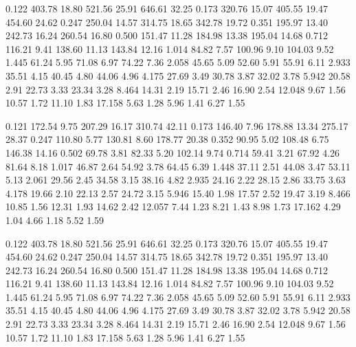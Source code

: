 
 0.122  403.78   18.80  521.56   25.91  646.61   32.25
 0.173  320.76   15.07  405.55   19.47  454.60   24.62
 0.247  250.04   14.57  314.75   18.65  342.78   19.72
 0.351  195.97   13.40  242.73   16.24  260.54   16.80
 0.500  151.47   11.28  184.98   13.38  195.04   14.68
 0.712  116.21    9.41  138.60   11.13  143.84   12.16
 1.014   84.82    7.57  100.96    9.10  104.03    9.52
 1.445   61.24    5.95   71.08    6.97   74.22    7.36
 2.058   45.65    5.09   52.60    5.91   55.91    6.11
 2.933   35.51    4.15   40.45    4.80   44.06    4.96
 4.175   27.69    3.49   30.78    3.87   32.02    3.78
 5.942   20.58    2.91   22.73    3.33   23.34    3.28
 8.464   14.31    2.19   15.71    2.46   16.90    2.54
12.048    9.67    1.56   10.57    1.72   11.10    1.83
17.158    5.63    1.28    5.96    1.41    6.27    1.55

 
 0.121  172.54    9.75  207.29   16.17  310.74   42.11
 0.173  146.40    7.96  178.88   13.34  275.17   28.37
 0.247  110.80    5.77  130.81    8.60  178.77   20.38
 0.352   90.95    5.02  108.48    6.75  146.38   14.16
 0.502   69.78    3.81   82.33    5.20  102.14    9.74
 0.714   59.41    3.21   67.92    4.26   81.64    8.18
 1.017   46.87    2.64   54.92    3.78   64.45    6.39
 1.448   37.11    2.51   44.08    3.47   53.11    5.13
 2.061   29.56    2.45   34.58    3.15   38.16    4.82
 2.935   24.16    2.22   28.15    2.86   33.75    3.63
 4.178   19.66    2.10   22.13    2.57   24.72    3.15
 5.946   15.40    1.98   17.57    2.52   19.47    3.19
 8.466   10.85    1.56   12.31    1.93   14.62    2.42
12.057    7.44    1.23    8.21    1.43    8.98    1.73
17.162    4.29    1.04    4.66    1.18    5.52    1.59

 0.122  403.78   18.80  521.56   25.91  646.61   32.25
 0.173  320.76   15.07  405.55   19.47  454.60   24.62
 0.247  250.04   14.57  314.75   18.65  342.78   19.72
 0.351  195.97   13.40  242.73   16.24  260.54   16.80
 0.500  151.47   11.28  184.98   13.38  195.04   14.68
 0.712  116.21    9.41  138.60   11.13  143.84   12.16
 1.014   84.82    7.57  100.96    9.10  104.03    9.52
 1.445   61.24    5.95   71.08    6.97   74.22    7.36
 2.058   45.65    5.09   52.60    5.91   55.91    6.11
 2.933   35.51    4.15   40.45    4.80   44.06    4.96
 4.175   27.69    3.49   30.78    3.87   32.02    3.78
 5.942   20.58    2.91   22.73    3.33   23.34    3.28
 8.464   14.31    2.19   15.71    2.46   16.90    2.54
12.048    9.67    1.56   10.57    1.72   11.10    1.83
17.158    5.63    1.28    5.96    1.41    6.27    1.55


